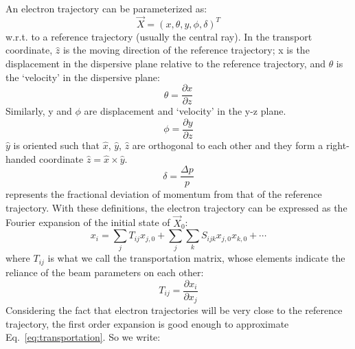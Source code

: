 An electron trajectory can be parameterized as: 
\begin{equation}
    \vec{X} = (x, \theta, y, \phi, \delta)^T
\end{equation}
w.r.t. to a reference trajectory (usually the central ray). In the transport coordinate, 
$\hat{z}$ is the moving direction of the reference trajectory;
x is the displacement in the dispersive plane relative to the reference 
trajectory, and $\theta$ is the `velocity' in the dispersive plane:
\begin{equation}
    \theta = \frac{\partial x}{\partial z}
\end{equation}
Similarly, y and $\phi$ are displacement and `velocity' in the y-z plane. 
\begin{equation}
    \phi = \frac{\partial y}{\partial z}
\end{equation}
$\hat{y}$ is oriented such that $\hat{x}$, $\hat{y}$, $\hat{z}$ are orthogonal 
to each other and they form a right-handed coordinate $\hat{z} = \hat{x} \times \hat{y}$.
\begin{equation}
    \delta = \frac{\Delta p}{p}
\end{equation}
represents the fractional deviation of momentum from that of the reference trajectory. 
With these definitions, the electron trajectory can be expressed
as the Fourier expansion of the initial state of $\vec{X}_0$:
\begin{equation}
    x_i = \sum_j T_{ij} x_{j,0} + \sum_j \sum_k S_{ijk} x_{j,0}x_{k, 0} + \cdots
    \label{eq:transportation}
\end{equation}
where $T_{ij}$ is what we call the transportation matrix, whose elements indicate
the reliance of the beam parameters on each other: 
\begin{equation}
    T_{ij} = \frac{\partial x_i}{\partial x_j}
\end{equation}
Considering the fact that electron trajectories will be very close to the 
reference trajectory, the first order expansion is good enough to approximate 
Eq.~\ref{eq:transportation}. So we write:
